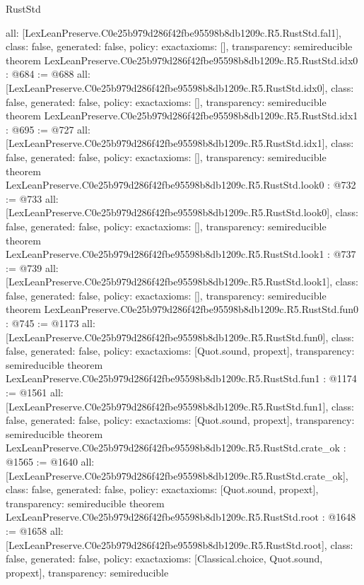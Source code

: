 \begin{lexlean}{RustStd}
\begin{coremodule}
{  all: [LexLeanPreserve.C0e25b979d286f42fbe95598b8db1209c.R5.RustStd.fal1],
  class: false,
  generated: false,
  policy: exact{axioms: []},
  transparency: semireducible
}
theorem LexLeanPreserve.C0e25b979d286f42fbe95598b8db1209c.R5.RustStd.idx0 : @684 := @688 {
  all: [LexLeanPreserve.C0e25b979d286f42fbe95598b8db1209c.R5.RustStd.idx0],
  class: false,
  generated: false,
  policy: exact{axioms: []},
  transparency: semireducible
}
theorem LexLeanPreserve.C0e25b979d286f42fbe95598b8db1209c.R5.RustStd.idx1 : @695 := @727 {
  all: [LexLeanPreserve.C0e25b979d286f42fbe95598b8db1209c.R5.RustStd.idx1],
  class: false,
  generated: false,
  policy: exact{axioms: []},
  transparency: semireducible
}
theorem LexLeanPreserve.C0e25b979d286f42fbe95598b8db1209c.R5.RustStd.look0 : @732 := @733 {
  all: [LexLeanPreserve.C0e25b979d286f42fbe95598b8db1209c.R5.RustStd.look0],
  class: false,
  generated: false,
  policy: exact{axioms: []},
  transparency: semireducible
}
theorem LexLeanPreserve.C0e25b979d286f42fbe95598b8db1209c.R5.RustStd.look1 : @737 := @739 {
  all: [LexLeanPreserve.C0e25b979d286f42fbe95598b8db1209c.R5.RustStd.look1],
  class: false,
  generated: false,
  policy: exact{axioms: []},
  transparency: semireducible
}
theorem LexLeanPreserve.C0e25b979d286f42fbe95598b8db1209c.R5.RustStd.fun0 : @745 := @1173 {
  all: [LexLeanPreserve.C0e25b979d286f42fbe95598b8db1209c.R5.RustStd.fun0],
  class: false,
  generated: false,
  policy: exact{axioms: [Quot.sound, propext]},
  transparency: semireducible
}
theorem LexLeanPreserve.C0e25b979d286f42fbe95598b8db1209c.R5.RustStd.fun1 : @1174 := @1561 {
  all: [LexLeanPreserve.C0e25b979d286f42fbe95598b8db1209c.R5.RustStd.fun1],
  class: false,
  generated: false,
  policy: exact{axioms: [Quot.sound, propext]},
  transparency: semireducible
}
theorem LexLeanPreserve.C0e25b979d286f42fbe95598b8db1209c.R5.RustStd.crate_ok : @1565 := @1640 {
  all: [LexLeanPreserve.C0e25b979d286f42fbe95598b8db1209c.R5.RustStd.crate_ok],
  class: false,
  generated: false,
  policy: exact{axioms: [Quot.sound, propext]},
  transparency: semireducible
}
theorem LexLeanPreserve.C0e25b979d286f42fbe95598b8db1209c.R5.RustStd.root : @1648 := @1658 {
  all: [LexLeanPreserve.C0e25b979d286f42fbe95598b8db1209c.R5.RustStd.root],
  class: false,
  generated: false,
  policy: exact{axioms: [Classical.choice, Quot.sound, propext]},
  transparency: semireducible
}


\end{coremodule}
\end{lexlean}
